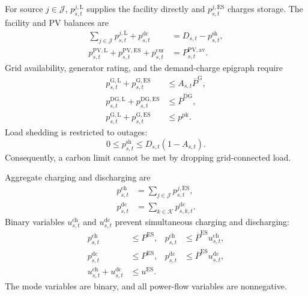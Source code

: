 \documentclass[times]{elsarticle}
\begin{document}
For source $j\in\mathcal J$, $p^{j,\mathrm L}_{s,t}$ supplies the facility
directly and $p^{j,\mathrm{ES}}_{s,t}$ charges storage. The facility and PV
balances are
\begin{align}
\sum_{j\in\mathcal J}p^{j,\mathrm L}_{s,t}+p^{\mathrm{dc}}_{s,t}
&=D_{s,t}-p^{\mathrm{sh}}_{s,t},
\label{eq:site_balance}\\
p^{\mathrm{PV},\mathrm L}_{s,t}+p^{\mathrm{PV},\mathrm{ES}}_{s,t}
+p^{\mathrm{cur}}_{s,t}
&=P^{\mathrm{PV,av}}_{s,t}.
\label{eq:pv_balance}
\end{align}
Grid availability, generator rating, and the demand-charge epigraph require
\begin{align}
p^{\mathrm{G},\mathrm L}_{s,t}+p^{\mathrm{G},\mathrm{ES}}_{s,t}
&\le A_{s,t}\overline P^{\mathrm G},
\label{eq:grid_limit}\\
p^{\mathrm{DG},\mathrm L}_{s,t}+p^{\mathrm{DG},\mathrm{ES}}_{s,t}
&\le\overline P^{\mathrm{DG}},
\label{eq:diesel_limit}\\
p^{\mathrm{G},\mathrm L}_{s,t}+p^{\mathrm{G},\mathrm{ES}}_{s,t}
&\le p^{\mathrm{pk}}.
\label{eq:peak_limit}
\end{align}
Load shedding is restricted to outages:
\begin{equation}
0\le p^{\mathrm{sh}}_{s,t}\le D_{s,t}(1-A_{s,t}).
\label{eq:outage_shedding}
\end{equation}
Consequently, a carbon limit cannot be met by dropping grid-connected load.

Aggregate charging and discharging are
\begin{align}
p^{\mathrm{ch}}_{s,t}&=\sum_{j\in\mathcal J}p^{j,\mathrm{ES}}_{s,t},
\label{eq:total_charge}\\
p^{\mathrm{dc}}_{s,t}&=\sum_{k\in\mathcal K}p^{\mathrm{dc}}_{s,k,t}.
\label{eq:total_discharge}
\end{align}
Binary variables $u^{\mathrm{ch}}_{s,t}$ and $u^{\mathrm{dc}}_{s,t}$ prevent
simultaneous charging and discharging:
\begin{align}
p^{\mathrm{ch}}_{s,t}&\le P^{\mathrm{ES}}, &
p^{\mathrm{ch}}_{s,t}&\le\overline P^{\mathrm{ES}} u^{\mathrm{ch}}_{s,t},
\label{eq:charge_limit}\\
p^{\mathrm{dc}}_{s,t}&\le P^{\mathrm{ES}}, &
p^{\mathrm{dc}}_{s,t}&\le\overline P^{\mathrm{ES}} u^{\mathrm{dc}}_{s,t},
\label{eq:discharge_limit}\\
u^{\mathrm{ch}}_{s,t}+u^{\mathrm{dc}}_{s,t}&\le u^{\mathrm{ES}}.
\label{eq:mode}
\end{align}
The mode variables are binary, and all power-flow variables are nonnegative.
\end{document}
